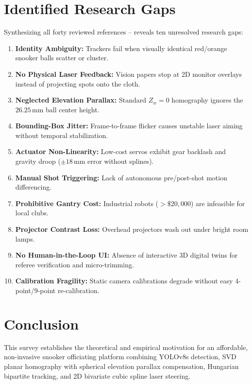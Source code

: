 \documentclass[conference]{IEEEtran}
\begin{document}
\section{Identified Research Gaps}
Synthesizing all forty reviewed references \cite{ref1}--\cite{ref40} reveals ten unresolved research gaps:
\begin{enumerate}
    \item \textbf{Identity Ambiguity:} Trackers fail when visually identical red/orange snooker balls scatter or cluster.
    \item \textbf{No Physical Laser Feedback:} Vision papers stop at 2D monitor overlays instead of projecting spots onto the cloth.
    \item \textbf{Neglected Elevation Parallax:} Standard $Z_w=0$ homography ignores the $26.25\,\text{mm}$ ball center height.
    \item \textbf{Bounding-Box Jitter:} Frame-to-frame flicker causes unstable laser aiming without temporal stabilization.
    \item \textbf{Actuator Non-Linearity:} Low-cost servos exhibit gear backlash and gravity droop ($\pm 18\,\text{mm}$ error without splines).
    \item \textbf{Manual Shot Triggering:} Lack of autonomous pre/post-shot motion differencing.
    \item \textbf{Prohibitive Gantry Cost:} Industrial robots ($>\$20{,}000$) are infeasible for local clubs.
    \item \textbf{Projector Contrast Loss:} Overhead projectors wash out under bright room lamps.
    \item \textbf{No Human-in-the-Loop UI:} Absence of interactive 3D digital twins for referee verification and micro-trimming.
    \item \textbf{Calibration Fragility:} Static camera calibrations degrade without easy 4-point/9-point re-calibration.
\end{enumerate}

\section{Conclusion}
This survey establishes the theoretical and empirical motivation for an affordable, non-invasive snooker officiating platform combining YOLOv8s detection, SVD planar homography with spherical elevation parallax compensation, Hungarian bipartite tracking, and 2D bivariate cubic spline laser steering.
\end{document}
